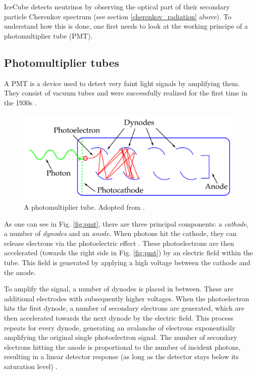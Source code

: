 \documentclass[
    a4paper, %
    fontsize=10pt, %
    twoside=true, %
    numbers=noenddot, %
    fontmethod=tex, %
]{kaobook}
\begin{document}
IceCube detects neutrinos by observing the optical part of their secondary particle Cherenkov spectrum (see section \ref{cherenkov_radiation} above). To understand how this is done, one first needs to look at the working principe of a photomultiplier tube (PMT).

\subsection*{Photomultiplier tubes}
A PMT is a device used to detect very faint light signals by amplifying them. They consist of vacuum tubes and were successfully realized for the first time in the 1930s .

\begin{figure}[h!]
    \includegraphics{ic_pmt_annotated.pdf}
    \caption[PMT schematic]{A photomultiplier tube. Adopted from \cite{Bednarski2014}.}
\end{figure}

As one can see in Fig. \ref{fig:pmt}, there are three principal components: a \textit{cathode}, a number of \textit{dynodes} and an \textit{anode}. When photons hit the cathode, they can release electrons via the photoelectric effect . These photoelectrons are then accelerated (towards the right side in Fig. \ref{fig:pmt}) by an electric field within the tube. This field is generated by applying a high voltage between the cathode and the anode.

To amplify the signal, a number of dynodes is placed in between. These are additional electrodes with subsequently higher voltages. When the photoelectron hits the first dynode, a number of secondary electrons are generated, which are then accelerated towards the next dynode by the electric field. This process repeats for every dynode, generating an avalanche of electrons exponentially amplifying the original single photoelectron signal. The number of secondary electrons hitting the anode is proportional to the number of incident photons, resulting in a linear detector response (as long as the detector stays below its saturation level) .
\end{document}

